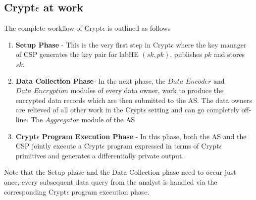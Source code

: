 \subsection{Crypt$\epsilon$ at work}
The complete workflow of Crypt$\epsilon$ is outlined as follows
\begin{enumerate}\item \textbf{Setup Phase} - This is the very first step in Crypt$\epsilon$ where the key manager of CSP generates the key pair for labHE $(sk,pk)$, publishes $pk$ and stores $sk$. \item \textbf{Data Collection Phase}- In the next phase, the $\textit{Data 
Encoder}$ and $\textit{Data Encryption}$ modules of every data owner, work to produce the encrypted data records which are then submitted to the AS. The data owners are relieved of all other work in the Crypt$\epsilon$ setting and can go completely off-line. The $\textit{Aggregator}$ module of the AS  \item \textbf{Crypt$\epsilon$ Program Execution Phase} - In this phase, both the AS and the CSP jointly execute a Crypt$\epsilon$ program expressed in terms of Crypt$\epsilon$ primitives and generates a differentially private output.  \end{enumerate}
Note that the Setup phase and the Data Collection phase need to occur just once, every subsequent data query from the analyst is handled via the corresponding Crypt$\epsilon$ program execution phase.
